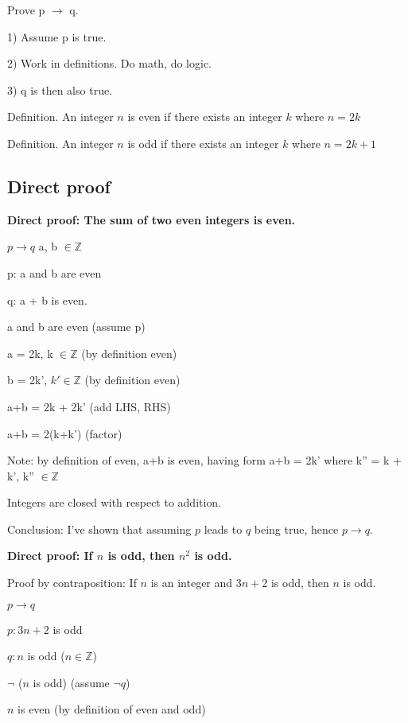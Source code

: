 \documentclass[english,openany]{book}
\begin{document}
	Prove p $\rightarrow$ q.

	1) Assume p is true.

	2) Work in definitions. Do math, do logic.

	3) q is then also true.\newline

	Definition. An integer $n$ is even if there exists an integer $k$ where $n = 2k$\newline

	Definition. An integer $n$ is odd if there exists an integer $k$ where $n = 2k + 1$\newline

	\subsection{Direct proof}

	\textbf{Direct proof: The sum of two even integers is even.}

	$p \rightarrow q$
	a, b $\in {\mathbb Z}$

	p: a and b are even

	q: a + b is even.

	a and b are even (assume p)

	a = 2k, k $\in {\mathbb Z}$ (by definition even)

	b = 2k', $k' \in {\mathbb Z}$ (by definition even)

	a+b = 2k + 2k' (add LHS, RHS)

	a+b = 2(k+k') (factor)

	Note: by definition of even, a+b is even, having form a+b = 2k' where k'' = k + k', k'' $\in {\mathbb Z}$

	Integers are closed with respect to addition.

	Conclusion: I've shown that assuming $p$ leads to $q$ being true, hence $p \rightarrow q$.\newline

	\textbf{Direct proof: If $n$ is odd, then $n^2$ is odd.}

	Proof by contraposition: If $n$ is an integer and $3n+2$ is odd, then $n$ is odd.

	$p \rightarrow q$

	$p: 3n+2$ is odd

	$q: n$ is odd ($n \in {\mathbb Z}$)

	$\neg$ ($n$ is odd) (assume $\neg q$)

	$n$ is even (by definition of even and odd)
\end{document}
